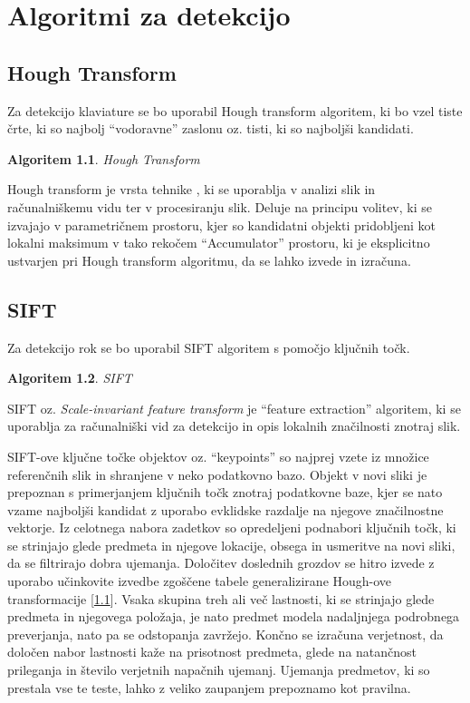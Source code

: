 \documentclass[a4paper,12pt,openright]{book}
\newtheorem{algoritem}{Algoritem}[chapter]
\begin{document}
\chapter{Algoritmi za detekcijo}
\label{ch1}
\section{Hough Transform}
Za detekcijo klaviature se bo uporabil Hough transform algoritem, ki bo vzel tiste črte, ki so najbolj \enquote{vodoravne}  zaslonu oz. tisti, ki so najboljši kandidati. \cite{hough}
\begin{algoritem}
\label{iz:1}
Hough Transform
\end{algoritem}

Hough transform je vrsta tehnike , ki se uporablja v analizi slik in računalniškemu vidu ter v procesiranju slik. Deluje na principu volitev, ki se izvajajo v parametričnem prostoru, kjer so kandidatni objekti pridobljeni kot lokalni maksimum v tako rekočem \enquote{Accumulator} prostoru, ki je eksplicitno ustvarjen pri Hough transform algoritmu, da se lahko izvede in izračuna.
\clearpage
\section{SIFT}
\noindent Za detekcijo rok se bo uporabil SIFT algoritem s pomočjo ključnih točk.
\begin{algoritem}
\label{iz:2}
SIFT
\end{algoritem}
SIFT oz. \textit{Scale-invariant feature transform} je \enquote{feature extraction} algoritem, ki se uporablja za računalniški vid za detekcijo in opis lokalnih značilnosti znotraj slik. 

SIFT-ove ključne točke objektov oz. \enquote{keypoints} so najprej vzete iz množice referenčnih slik in shranjene v neko podatkovno bazo. Objekt v novi sliki je prepoznan s primerjanjem ključnih točk znotraj podatkovne baze, kjer se nato vzame najboljši kandidat z uporabo evklidske razdalje na njegove značilnostne vektorje. Iz celotnega nabora zadetkov so opredeljeni podnabori ključnih točk, ki se strinjajo glede predmeta in njegove lokacije, obsega in usmeritve na novi sliki, da se filtrirajo dobra ujemanja. Določitev doslednih grozdov se hitro izvede z uporabo učinkovite izvedbe zgoščene tabele generalizirane Hough-ove transformacije [\ref{iz:1}]. Vsaka skupina treh ali več lastnosti, ki se strinjajo glede predmeta in njegovega položaja, je nato predmet modela nadaljnjega podrobnega preverjanja, nato pa se odstopanja zavržejo. Končno se izračuna verjetnost, da določen nabor lastnosti kaže na prisotnost predmeta, glede na natančnost prileganja in število verjetnih napačnih ujemanj. Ujemanja predmetov, ki so prestala vse te teste, lahko z veliko zaupanjem prepoznamo kot pravilna.
\end{document}

